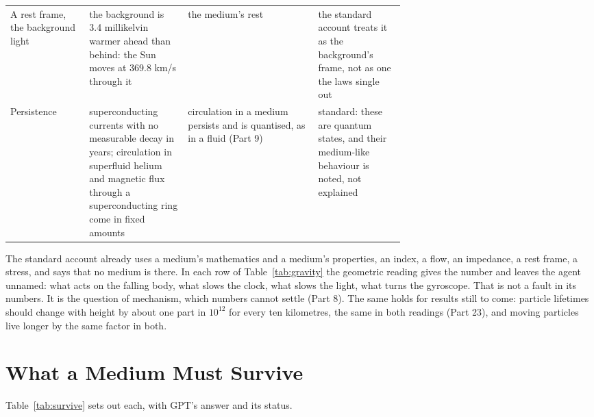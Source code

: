 \begin{table}[p]
\begin{tabularx}{\linewidth}{@{}>{\raggedright\arraybackslash}p{0.2\linewidth} >{\raggedright\arraybackslash}p{0.25\linewidth} >{\raggedright\arraybackslash}X >{\raggedright\arraybackslash}p{0.22\linewidth}@{}}
A rest frame, the background light & the background is 3.4 millikelvin warmer ahead than behind: the Sun moves at 369.8 km/s through it & the medium's rest & the standard account treats it as the background's frame, not as one the laws single out\\
Persistence & superconducting currents with no measurable decay in years; circulation in superfluid helium and magnetic flux through a superconducting ring come in fixed amounts & circulation in a medium persists and is quantised, as in a fluid (Part 9) & standard: these are quantum states, and their medium-like behaviour is noted, not explained\\\bottomrule
\end{tabularx}\label{tab:light}\end{table}

\nocite{lebedev1901,nichols1901,lamoreaux1997,jaffe2005,planck2020dipole,file1963,vinen1961,rashadaPart7}

 The standard account already uses a medium's mathematics and a medium's properties, an index, a flow, an impedance, a rest frame, a stress, and says that no medium is there. In each row of Table~\ref{tab:gravity} the geometric reading gives the number and leaves the agent unnamed: what acts on the falling body, what slows the clock, what slows the light, what turns the gyroscope. That is not a fault in its numbers. It is the question of mechanism, which numbers cannot settle (Part 8). The same holds for results still to come: particle lifetimes should change with height by about one part in $10^{12}$ for every ten kilometres, the same in both readings (Part 23), and moving particles live longer by the same factor in both.

\section{What a Medium Must Survive}\label{sec:survive}

 Table~\ref{tab:survive} sets out each, with GPT's answer and its status.

